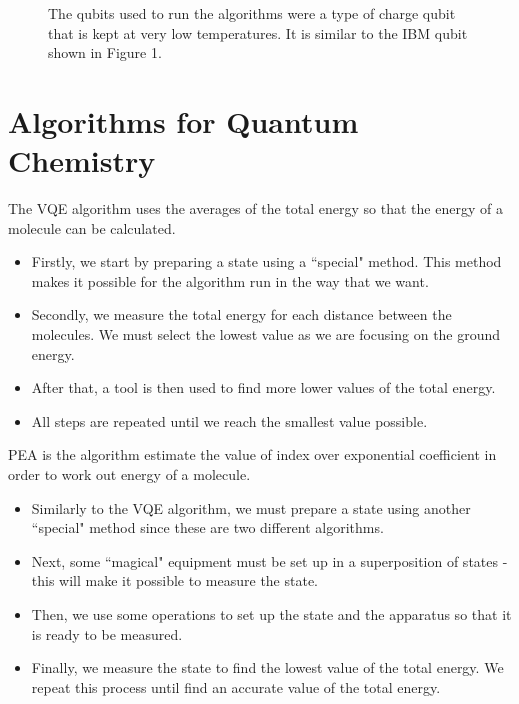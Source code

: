 \documentclass[14pt,landscape,color=UCLdarkred,margin=3cm]{uclposter}
\begin{document}
\begin{multicols}{3}
\begin{figure}[H]
\begin{center}
\begin{minipage}[c]{9em}
  \end{minipage}
  \qquad
  \begin{minipage}[c]{20em}

The qubits used to run the algorithms were a type of charge qubit that is kept at very low temperatures. It is similar to the IBM qubit shown in Figure 1.

  \end{minipage}
  \end{center}

   
\end{figure}

\section*{Algorithms for Quantum Chemistry}

The VQE algorithm uses the averages of the total energy so that the energy of a molecule can be calculated.

\begin{highlightbox}
  \begin{itemize}
\item Firstly, we start by preparing a state using a ``special" method. This method makes it possible for the algorithm run in the way that we want.
\item Secondly, we measure the total energy for each distance between the molecules. We must select the lowest value as we are focusing on the ground energy.
\item After that, a tool is then used to find more lower values of the total energy.
\item All steps are repeated until we reach the smallest value possible.
\end{itemize}
\end{highlightbox}

PEA is the algorithm estimate the value of index over exponential coefficient in order to work out energy of a molecule.


\begin{highlightbox}
\begin{itemize}
\item Similarly to the VQE algorithm, we must prepare a state using another ``special" method since these are two different algorithms. 
\item Next, some ``magical" equipment must be set up in a superposition of states - this will make it possible to measure the state.
\item Then, we use some operations to set up the state and the apparatus so that it is ready to be measured. 
\item Finally, we measure the state to find the lowest value of the total energy. We repeat this process until find an accurate value of the total energy.
\end{itemize}
\end{highlightbox}




\end{multicols}
\end{document}
